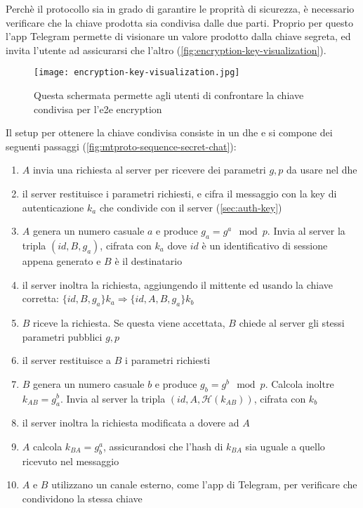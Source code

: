 Perchè il protocollo sia in grado di garantire le proprità di sicurezza, è necessario verificare che la chiave prodotta sia condivisa dalle due parti.
Proprio per questo l'app Telegram permette di visionare un valore prodotto dalla chiave segreta, ed invita l'utente ad assicurarsi che l'altro (\autoref{fig:encryption-key-visualization}).

\begin{figure}[h]
    \centering
    \texttt{[image: encryption-key-visualization.jpg]}
    \caption{Questa schermata permette agli utenti di confrontare la chiave condivisa per l'\gls{e2e} encryption \cite{que:secret-chat}} \label{fig:encryption-key-visualization}
\end{figure}

Il setup per ottenere la chiave condivisa consiste in un \gls{dhe} e si compone dei seguenti passaggi (\autoref{fig:mtproto-sequence-secret-chat}):

\begin{enumerate}
    \item $A$ invia una richiesta al server per ricevere dei parametri $g, p$ da usare nel \gls{dhe}
    \item il server restituisce i parametri richiesti, e cifra il messaggio con la key di autenticazione $k_a$ che condivide con il server (\autoref{sec:auth-key})
    \item $A$ genera un numero casuale $a$ e produce $g_a = g^a \mod p$. Invia al server la tripla $(id, B, g_a)$, cifrata con $k_a$ dove $id$ è un identificativo di sessione
          appena generato e $B$ è il destinatario
    \item il server inoltra la richiesta, aggiungendo il mittente ed usando la chiave corretta: $\{id, B, g_a\}k_a \Rightarrow \{id, A, B, g_a\}k_b$
    \item $B$ riceve la richiesta. Se questa viene accettata, $B$ chiede al server gli stessi parametri pubblici $g, p$
    \item il server restituisce a $B$ i parametri richiesti
    \item $B$ genera un numero casuale $b$ e produce $g_b = g^b \mod p$. Calcola inoltre $k_{AB} = g_a^b$. Invia al server la tripla $(id, A, \mathcal{H}(k_{AB}))$, cifrata con $k_b$
    \item il server inoltra la richiesta modificata a dovere ad $A$
    \item $A$ calcola $k_{BA} = g_b^a$, assicurandosi che l'hash di $k_{BA}$ sia uguale a quello ricevuto nel messaggio
    \item $A$ e $B$ utilizzano un canale esterno, come l'app di Telegram, per verificare che condividono la stessa chiave
\end{enumerate}

